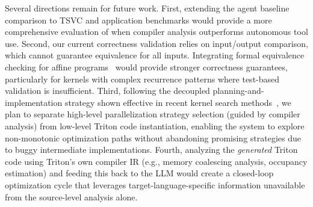 \documentclass[sigconf]{acmart}
\begin{document}
Several directions remain for future work.
First, extending the agent baseline comparison to TSVC and application benchmarks would provide a more comprehensive evaluation of when compiler analysis outperforms autonomous tool use.
Second, our current correctness validation relies on input/output comparison, which cannot guarantee equivalence for all inputs. Integrating formal equivalence checking for affine programs~\cite{verdoolaege2012equiv,barthou2012widening,lefevre2023verified} would provide stronger correctness guarantees, particularly for kernels with complex recurrence patterns where test-based validation is insufficient.
Third, following the decoupled planning-and-implementation strategy shown effective in recent kernel search methods~\cite{cao2026ksearch}, we plan to separate high-level parallelization strategy selection (guided by compiler analysis) from low-level Triton code instantiation, enabling the system to explore non-monotonic optimization paths without abandoning promising strategies due to buggy intermediate implementations.
Fourth, analyzing the \emph{generated} Triton code using Triton's own compiler IR (e.g., memory coalescing analysis, occupancy estimation) and feeding this back to the LLM would create a closed-loop optimization cycle that leverages target-language-specific information unavailable from the source-level analysis alone.
\end{document}

